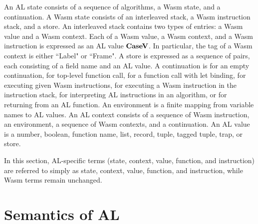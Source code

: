 An AL state consists of a sequence of algorithms, a Wasm state, and a
continuation.
A Wasm state consists of an interleaved stack, a Wasm instruction stack, and a
store.
An interleaved stack contains two types of entries: a Wasm value and a Wasm
context.
Each of a Wasm value, a Wasm context, and a Wasm instruction is expressed as an
AL value $\textbf{CaseV}$.
In particular, the tag of a Wasm context is either ``Label" or ``Frame".
A store is expressed as a sequence of pairs, each consisting of a field name
and an AL value.
A continuation is \mt{} for an empty continuation, \toplevelcall{} for
top-level function call, \call{} for a function call with let binding, \exe{}
for executing given Wasm instructions, \wasm{} for executing a Wasm instruction
in the instruction stack, \algo{} for interpreting AL instructions in an
algorithm, or \ret{} for returning from an AL function.
An environment is a finite mapping from variable names to AL values.
An AL context consists of a sequence of Wasm instruction, an environment, a
sequence of Wasm contexts, and a continuation.
An AL value is a number, boolean, function name, list, record, tuple, tagged tuple,
trap, or store.


In this section, AL-specific terms (state, context, value, function, and
instruction) are referred to simply as state, context, value, function, and
instruction, while Wasm terms remain unchanged.




\newpage
\section{Semantics of AL}
\label{semantics}


